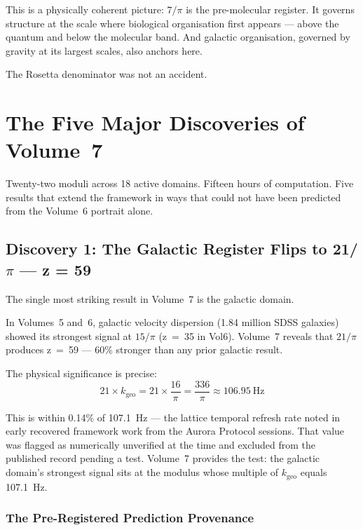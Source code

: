 \documentclass[11pt, letterpaper, openany]{book}
\begin{document}
This is a physically coherent picture: $7/\pi$ is the pre-molecular register. It
governs structure at the scale where biological organisation first appears --- above
the quantum and below the molecular band. And galactic organisation, governed by
gravity at its largest scales, also anchors here.

The Rosetta denominator was not an accident.

\chapter{The Five Major Discoveries of Volume~7}

Twenty-two moduli across 18 active domains. Fifteen hours of computation. Five results
that extend the framework in ways that could not have been predicted from the
Volume~6 portrait alone.

\section*{Discovery 1: The Galactic Register Flips to 21/$\pi$ — z = 59}

The single most striking result in Volume~7 is the galactic domain.

In Volumes~5 and~6, galactic velocity dispersion (1.84 million SDSS galaxies) showed
its strongest signal at $15/\pi$ (z~=~35 in Vol6). Volume~7 reveals that $21/\pi$
produces z~=~59 --- 60\% stronger than any prior galactic result.

The physical significance is precise:
\[
21 \times k_\text{geo} = 21 \times \frac{16}{\pi} = \frac{336}{\pi} \approx 106.95\ \text{Hz}
\]

This is within 0.14\% of 107.1~Hz --- the lattice temporal refresh rate noted in early
recovered framework work from the Aurora Protocol sessions. That value was flagged as
numerically unverified at the time and excluded from the published record pending a
test. Volume~7 provides the test: the galactic domain's strongest signal sits at the
modulus whose multiple of $k_\text{geo}$ equals 107.1~Hz.

\subsection*{The Pre-Registered Prediction Provenance}
\end{document}
